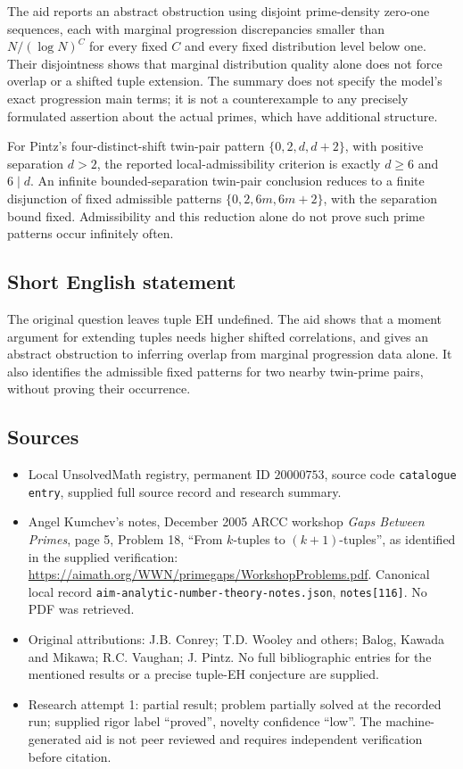 \documentclass[11pt]{article}
\begin{document}
The aid reports an abstract obstruction using disjoint prime-density zero-one sequences, each with marginal progression discrepancies smaller than $N/(\log N)^C$ for every fixed $C$ and every fixed distribution level below one. Their disjointness shows that marginal distribution quality alone does not force overlap or a shifted tuple extension. The summary does not specify the model's exact progression main terms; it is not a counterexample to any precisely formulated assertion about the actual primes, which have additional structure.

For Pintz's four-distinct-shift twin-pair pattern $\{0,2,d,d+2\}$, with positive separation $d>2$, the reported local-admissibility criterion is exactly $d\geq6$ and $6\mid d$. An infinite bounded-separation twin-pair conclusion reduces to a finite disjunction of fixed admissible patterns $\{0,2,6m,6m+2\}$, with the separation bound fixed. Admissibility and this reduction alone do not prove such prime patterns occur infinitely often.
\subsection{Short English statement}
The original question leaves tuple EH undefined. The aid shows that a moment argument for extending tuples needs higher shifted correlations, and gives an abstract obstruction to inferring overlap from marginal progression data alone. It also identifies the admissible fixed patterns for two nearby twin-prime pairs, without proving their occurrence.
\subsection{Sources}
\begin{itemize}
\item Local UnsolvedMath registry, permanent ID $20000753$, source code \texttt{catalogue entry}, supplied full source record and research summary.
\item Angel Kumchev's notes, December 2005 ARCC workshop \emph{Gaps Between Primes}, page 5, Problem 18, ``From $k$-tuples to $(k+1)$-tuples'', as identified in the supplied verification: \url{https://aimath.org/WWN/primegaps/WorkshopProblems.pdf}. Canonical local record \texttt{aim-analytic-number-theory-notes.json}, \texttt{notes[116]}. No PDF was retrieved.
\item Original attributions: J.B. Conrey; T.D. Wooley and others; Balog, Kawada and Mikawa; R.C. Vaughan; J. Pintz. No full bibliographic entries for the mentioned results or a precise tuple-EH conjecture are supplied.
\item Research attempt 1: partial result; problem partially solved at the recorded run; supplied rigor label ``proved'', novelty confidence ``low''. The machine-generated aid is not peer reviewed and requires independent verification before citation.
\end{itemize}
\end{document}
